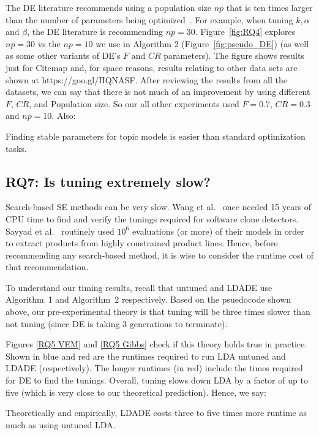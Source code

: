 \documentclass[twocolumn,5p,sort&compress]{elsarticle}
\newcommand{\fig}[1]{Figure~\ref{fig:#1}}
\theoremstyle{break}
\begin{document}
The DE literature
recommends using a population size $np$ that is ten times larger than the number of parameters being
optimized~\cite{storn1997differential}.  For example, when tuning $k,\alpha$ and $\beta$,
the DE literature is recommending $np=30$.
Figure~\ref{fig:RQ4} explores $np=30$ vs the $np=10$ we use in Algorithm 2 (\fig{pseudo_DE})
(as well as some other variants of DE's $F$ and $CR$ parameters).
The figure shows results just for Citemap and, for space reasons, results
relating to other data sets are shown at https://goo.gl/HQNASF.
After reviewing the results from all the datasets, we can say that there is not much of an improvement by using different $F$, $CR$, and Population size. So our all other experiments used $F=0.7$, $CR=0.3$ and $np = 10$.
Also:

\begin{lesson}
  Finding stable parameters for
  topic models is easier than standard optimization tasks.
\end{lesson}

\subsection{\textbf{RQ7: Is tuning extremely slow?}}

Search-based SE methods can be very slow. Wang et al.~\cite{wang2013searching} once needed 15
years of CPU time to find and verify the tunings required for software
clone detectors. Sayyad et al.~\cite{sayyad2013scalable} routinely used
$10^6$ evaluations (or more) of their models in order to extract
products from highly constrained product
lines. Hence, before recommending any
search-based method, it is wise to consider the runtime cost of that
recommendation.

To understand our timing results, recall that untuned and LDADE use
Algorithm~1 and Algorithm~2 respectively. Based on the psuedocode
shown above, our pre-experimental theory is that
tuning will be three times slower than not tuning (since DE is taking 3 generations to terminate).
 
Figures \ref{RQ5 VEM} and \ref{RQ5 Gibbs} check if this theory
holds true in practice. Shown in blue and red are the
  runtimes required to run LDA untuned and LDADE (respectively).  The
  longer runtimes (in red) include the times required for DE to find
  the tunings. Overall, tuning slows down LDA by a factor of up to
  five (which is very close to our theoretical prediction).
  Hence, we say:

  
  \begin{lesson}
    Theoretically and empirically, LDADE costs three to five times more runtime
    as much as using untuned LDA.
  \end{lesson}
\end{document}
